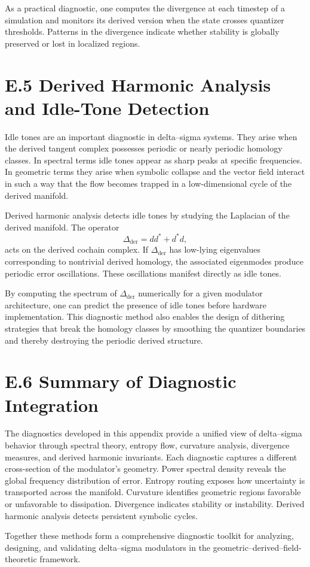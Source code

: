 As a practical diagnostic, one computes the divergence at each timestep of a simulation and monitors its derived version when the state crosses quantizer thresholds. Patterns in the divergence indicate whether stability is globally preserved or lost in localized regions.

\section{E.5 Derived Harmonic Analysis and Idle-Tone Detection}

Idle tones are an important diagnostic in delta–sigma systems. They arise when the derived tangent complex possesses periodic or nearly periodic homology classes. In spectral terms idle tones appear as sharp peaks at specific frequencies. In geometric terms they arise when symbolic collapse and the vector field interact in such a way that the flow becomes trapped in a low-dimensional cycle of the derived manifold.

Derived harmonic analysis detects idle tones by studying the Laplacian of the derived manifold. The operator
\[
\Delta_{\mathrm{der}} = d d^{\ast} + d^{\ast} d,
\]
acts on the derived cochain complex. If \(\Delta_{\mathrm{der}}\) has low-lying eigenvalues corresponding to nontrivial derived homology, the associated eigenmodes produce periodic error oscillations. These oscillations manifest directly as idle tones.

By computing the spectrum of \(\Delta_{\mathrm{der}}\) numerically for a given modulator architecture, one can predict the presence of idle tones before hardware implementation. This diagnostic method also enables the design of dithering strategies that break the homology classes by smoothing the quantizer boundaries and thereby destroying the periodic derived structure.

\section{E.6 Summary of Diagnostic Integration}

The diagnostics developed in this appendix provide a unified view of delta–sigma behavior through spectral theory, entropy flow, curvature analysis, divergence measures, and derived harmonic invariants. Each diagnostic captures a different cross-section of the modulator’s geometry. Power spectral density reveals the global frequency distribution of error. Entropy routing exposes how uncertainty is transported across the manifold. Curvature identifies geometric regions favorable or unfavorable to dissipation. Divergence indicates stability or instability. Derived harmonic analysis detects persistent symbolic cycles.

Together these methods form a comprehensive diagnostic toolkit for analyzing, designing, and validating delta–sigma modulators in the geometric–derived–field-theoretic framework.

